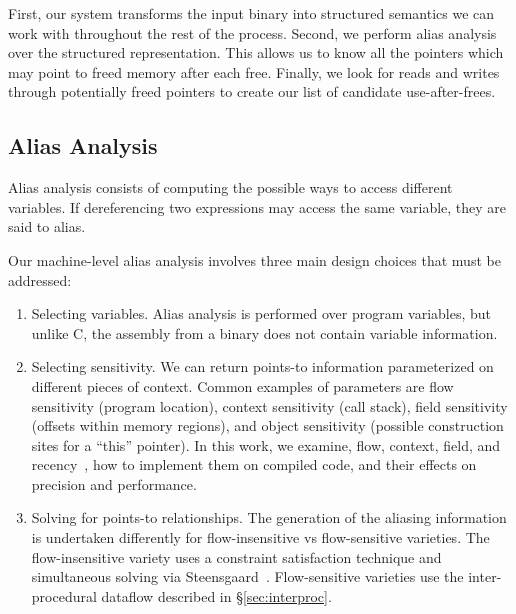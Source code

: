 \label{alias:sec:system}
First, our system transforms the input binary into structured
semantics we can work with throughout the rest of the process.
Second, we perform alias analysis over the structured representation.
This allows us to know all the pointers which may point to freed
memory after each free.  Finally, we look for reads and writes through
potentially freed pointers to create our list of candidate
use-after-frees.

\subsection{Alias Analysis}
Alias analysis consists of computing the possible ways to access different variables.
If dereferencing two expressions may access the same variable, they are said to alias.

Our machine-level alias analysis involves three main design choices that must be addressed:
\begin{enumerate}
\item Selecting variables.
  Alias analysis is performed over program variables, but unlike C, the assembly from a binary does not contain variable information.
\item Selecting sensitivity.
  We can return points-to information parameterized on different pieces of context.
  Common examples of parameters are flow sensitivity (program location), context sensitivity (call stack), field sensitivity (offsets within memory regions), and object sensitivity (possible construction sites for a ``this'' pointer).
  In this work, we examine, flow, context, field, and recency~\cite{vsa}, how to implement them on compiled code, and their effects on precision and performance.
\item Solving for points-to relationships.
  The generation of the aliasing information is undertaken differently for flow-insensitive vs flow-sensitive varieties.
  The flow-insensitive variety uses a constraint satisfaction technique and simultaneous solving via Steensgaard~\cite{steensgaard-alias}.
  Flow-sensitive varieties use the inter-procedural dataflow described in \S \ref{sec:interproc}.
\end{enumerate}

